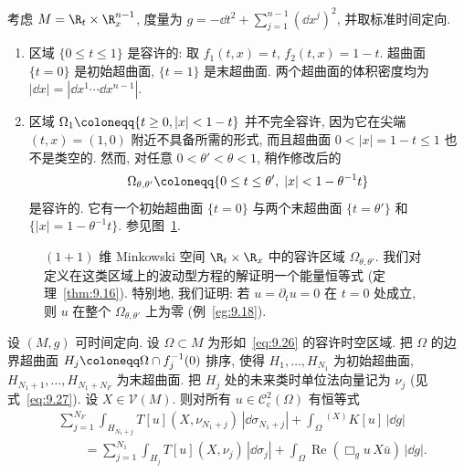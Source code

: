 \begin{example}\label{eg:9.15}
考虑 $M = \R_t \times \R_x^{n-1}$, 度量为 $g = -\dd t^2 + \sum_{j=1}^{n-1} (\dd x^j)^2$, 并取标准时间定向.
\begin{enumerate}
    \item 区域 $\{0 \le t \le 1\}$ 是容许的: 取 $f_1(t, x) = t$, $f_2(t, x) = 1 - t$. 超曲面 $\{t = 0\}$ 是初始超曲面, $\{t = 1\}$ 是末超曲面. 两个超曲面的体积密度均为 $|\dd x| = |\dd x^1 \cdots \dd x^{n-1}|$.
    \item 区域 $\Omega_1 \defeq \{t \ge 0, |x| < 1 - t\}$ 并不完全容许, 因为它在尖端 $(t, x) = (1, 0)$ 附近不具备所需的形式, 而且超曲面 $0 < |x| = 1 - t \le 1$ 也不是类空的. 然而, 对任意 $0 < \theta' < \theta < 1$, 稍作修改后的
    \begin{equation}\label{eq:9.30}
        \Omega_{\theta, \theta'} \defeq \{0 \le t \le \theta', \; |x| < 1 - \theta^{-1} t\}
    \end{equation}
    是容许的. 它有一个初始超曲面 $\{t = 0\}$ 与两个末超曲面 $\{t = \theta'\}$ 和 $\{|x| = 1 - \theta^{-1} t\}$. 参见图~\ref{fig:9.2}.
\end{enumerate}
\end{example}

\begin{figure}[htbp]
\centering
\drawFigNineTwo
\caption{$(1+1)$ 维 Minkowski 空间 $\R_t \times \R_x$ 中的容许区域 $\Omega_{\theta, \theta'}$. 我们对定义在这类区域上的波动型方程的解证明一个能量恒等式 (定理~\ref{thm:9.16}). 特别地, 我们证明: 若 $u = \partial_t u = 0$ 在 $t = 0$ 处成立, 则 $u$ 在整个 $\Omega_{\theta, \theta'}$ 上为零 (例~\ref{eg:9.18}).}\label{fig:9.2}
\end{figure}

\begin{theorem}[能量恒等式]\label{thm:9.16}
设 $(M, g)$ 可时间定向. 设 $\Omega \subset M$ 为形如~\eqref{eq:9.26} 的容许时空区域. 把 $\Omega$ 的边界超曲面 $H_j \defeq \Omega \cap f_j^{-1}(0)$ 排序, 使得 $H_1, \ldots, H_{N_1}$ 为初始超曲面, $H_{N_1+1}, \ldots, H_{N_1+N_F}$ 为末超曲面. 把 $H_j$ 处的未来类时单位法向量记为 $\nu_j$ (见式~\eqref{eq:9.27}). 设 $X \in \mathcal{V}(M)$. 则对所有 $u \in \mathcal{C}_{\mathrm{c}}^2(\Omega)$ 有恒等式
\begin{equation}\label{eq:9.31}
    \begin{aligned}
        &\sum_{j=1}^{N_F} \int_{H_{N_1+j}} T[u](X, \nu_{N_1+j}) \, |\dd \sigma_{N_1+j}| + \int_{\Omega} {}^{(X)} K[u] \, |\dd g| \\
        &\qquad = \sum_{j=1}^{N_1} \int_{H_j} T[u](X, \nu_j) \, |\dd \sigma_j| + \int_{\Omega} \operatorname{Re}(\Box_g u \, X \bar u) \, |\dd g|.
    \end{aligned}
\end{equation}
\end{theorem}


